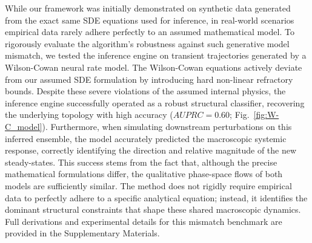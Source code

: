 \documentclass[10pt, aps, rmp,  twocolumn, superscriptaddress, floatfix, showkeys]{revtex4-2}
\begin{document}
While our framework was initially demonstrated on synthetic data generated from the exact same SDE equations used for inference, in real-world scenarios empirical data rarely adhere perfectly to an assumed mathematical model. To rigorously evaluate the algorithm's robustness against such generative model mismatch, we tested the inference engine on transient trajectories generated by a Wilson-Cowan neural rate model. 
The Wilson-Cowan equations actively deviate from our assumed SDE formulation by introducing hard non-linear refractory bounds. Despite these severe violations of the assumed internal physics, the inference engine successfully operated as a robust structural classifier, recovering the underlying topology with high accuracy ($AUPRC = 0.60$; Fig.~\ref{fig:W-C_model}). Furthermore, when simulating downstream perturbations on this inferred ensemble, the model accurately predicted the macroscopic systemic response, correctly identifying the direction and relative magnitude of the new steady-states. This success stems from the fact that, although the precise mathematical formulations differ, the qualitative phase-space flows of both models are sufficiently similar. The method does not rigidly require empirical data to perfectly adhere to a specific analytical equation; instead, it identifies the dominant structural constraints that shape these shared macroscopic dynamics. Full derivations and experimental details for this mismatch benchmark are provided in the Supplementary Materials.
\end{document}
